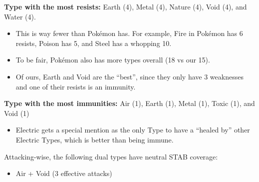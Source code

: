 \begin{itemize}
	\item{\textbf{Type with the most resists:} Earth (4), Metal (4), Nature (4), Void (4), and Water (4).
		\begin{itemize}
			\item{This is way fewer than Pok\'{e}mon has. For example, Fire in Pok\'{e}mon has 6 resists, Poison has 5, and Steel has a whopping 10.}
			\item{To be fair, Pok\'{e}mon also has more types overall (18 vs our 15).}
			\item{Of ours, Earth and Void are the ``best'', since they only have 3 weaknesses and one of their resists is an immunity.}
		\end{itemize}
		\item{\textbf{Type with the most immunities:} Air (1), Earth (1), Metal (1), Toxic (1), and Void (1)
			\begin{itemize}
				\item{Electric gets a special mention as the only Type to have a ``healed by'' other Electric Types, which is better than being immune.}
			\end{itemize}
		}
	}
\end{itemize}


Attacking-wise, the following dual types have neutral STAB coverage:
\begin{itemize}
	\item{Air + Void (3 effective attacks)}
\end{itemize}


